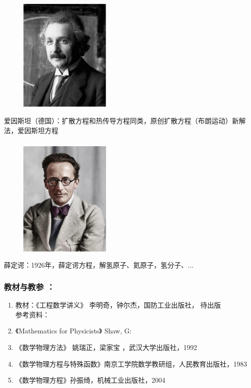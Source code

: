 \begin{frame}
	\frametitle{}
	\begin{center}
		\begin{figure}
			\includegraphics[width=4.5cm]{figs/fig1-3-8.png}	
		\end{figure}
	\end{center}
	{爱因斯坦（德国）：扩散方程和热传导方程同类，原创扩散方程（布朗运动）新解法，爱因斯坦方程}
\end{frame}

\begin{frame}
	\frametitle{}
	\begin{center}
		\begin{figure}
			\includegraphics[width=4.5cm]{figs/fig1-3-9.png}	
		\end{figure}
	\end{center}
	{薛定谔：1926年，薛定谔方程，解氢原子、氦原子，氢分子、... }
\end{frame}
\begin{frame}
	\frametitle{教材与教参 ：}
	\begin{enumerate}
		\item 教材：《工程数学讲义》 李明奇，钟尔杰，国防工业出版社， 待出版\\	\vspace{0.3cm}
     	参考资料：\\
		\item 《Mathematics for Physicists》 Shaw, G:
		\vspace{0.3cm}
		\item 《数学物理方法》 姚瑞正，梁家宝 ，武汉大学出版社，1992 
		\vspace{0.3cm}
		\item 《数学物理方程与特殊函数》南京工学院数学教研组，人民教育出版社，1983
		\vspace{0.3cm}
		\item 《数学物理方程》孙振绮，机械工业出版社，2004
	\end{enumerate}	
\end{frame}

